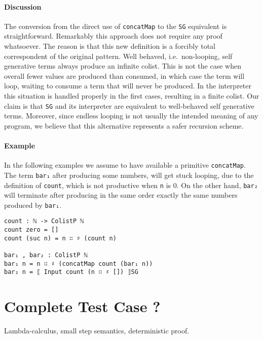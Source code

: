 \documentclass[10pt,a4paper]{article}
\begin{document}
\paragraph{Discussion}
The conversion from the direct use of \texttt{concatMap} to the \texttt{SG} equivalent is straightforward. Remarkably this approach does not require any proof whatsoever. The reason is that this new definition is a forcibly total 
correspondent of the original pattern. Well behaved, i.e.\ non-looping, self generative terms always produce an infinite colist. This is not the case when  overall fewer values are produced than consumed, in which case the term will loop, waiting to consume a term that will never be produced.
In the interpreter this situation is handled properly in the first cases, resulting in a finite colist. Our claim is that \texttt{SG} and its interpreter are equivalent to well-behaved self generative terms. Moreover, since endless looping is not usually the intended meaning of any program, we believe that this alternative represents a safer recursion scheme.

\paragraph{Example}
In the following examples we assume to have available a primitive \texttt{concatMap}. The term \texttt{bar₁} after producing some numbers, will get stuck looping, due to the definition of \texttt{count}, which is not productive when \texttt{n} is 0. On the other hand, \texttt{bar₂} will terminate after producing in the same order exactly the same numbers produced by \texttt{bar₁}.
\begin{verbatim}
count : ℕ -> ColistP ℕ
count zero = []
count (suc n) = n ∷ ♯ (count n)

bar₁ , bar₂ : ColistP ℕ
bar₁ n = n ∷ ♯ (concatMap count (bar₁ n))
bar₂ n = ⟦ Input count (n ∷ ♯ []) ⟧SG
\end{verbatim}

\section{Complete Test Case ?}
Lambda-calculus, small step semantics, deterministic proof.
\end{document}
